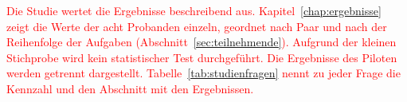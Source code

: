 %

\textcolor{red}{Die Studie wertet die Ergebnisse beschreibend aus. Kapitel~\ref{chap:ergebnisse} zeigt die Werte der acht Probanden einzeln, geordnet nach Paar und nach der Reihenfolge der Aufgaben (Abschnitt~\ref{sec:teilnehmende}). Aufgrund der kleinen Stichprobe wird kein statistischer Test durchgeführt. Die Ergebnisse des Piloten werden getrennt dargestellt. Tabelle~\ref{tab:studienfragen} nennt zu jeder Frage die Kennzahl und den Abschnitt mit den Ergebnissen.}

